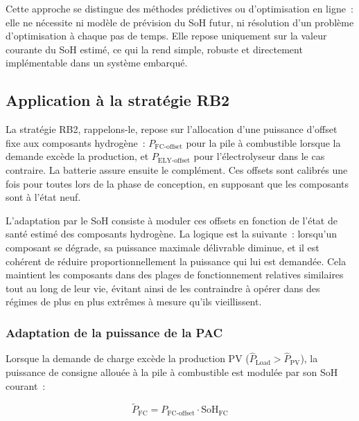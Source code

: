 Cette approche se distingue des méthodes prédictives ou d'optimisation en ligne~: elle ne nécessite ni modèle de prévision du SoH futur, ni résolution d'un problème d'optimisation à chaque pas de temps. Elle repose uniquement sur la valeur courante du SoH estimé, ce qui la rend simple, robuste et directement implémentable dans un système embarqué.

\subsection{Application à la stratégie RB2}

La stratégie RB2, rappelons-le, repose sur l'allocation d'une puissance d'offset fixe aux composants hydrogène~: $P_{\text{FC-offset}}$ pour la pile à combustible lorsque la demande excède la production, et $P_{\text{ELY-offset}}$ pour l'électrolyseur dans le cas contraire. La batterie assure ensuite le complément. Ces offsets sont calibrés une fois pour toutes lors de la phase de conception, en supposant que les composants sont à l'état neuf.

L'adaptation par le SoH consiste à moduler ces offsets en fonction de l'état de santé estimé des composants hydrogène. La logique est la suivante~: lorsqu'un composant se dégrade, sa puissance maximale délivrable diminue, et il est cohérent de réduire proportionnellement la puissance qui lui est demandée. Cela maintient les composants dans des plages de fonctionnement relatives similaires tout au long de leur vie, évitant ainsi de les contraindre à opérer dans des régimes de plus en plus extrêmes à mesure qu'ils vieillissent.

\subsubsection{Adaptation de la puissance de la PAC}

Lorsque la demande de charge excède la production PV ($\hat{P}_{\text{Load}} > \hat{P}_{\text{PV}}$), la puissance de consigne allouée à la pile à combustible est modulée par son SoH courant~:

\begin{equation}
    \tilde{P}_{\text{FC}} = P_{\text{FC-offset}} \cdot \text{SoH}_{\text{FC}}
    \label{eq:adaptation_fc}
\end{equation}

